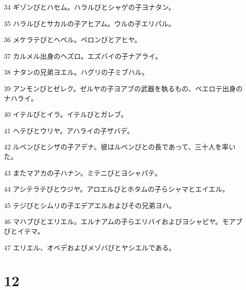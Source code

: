 \par 34 ギゾンびとハセム。ハラルびとシャゲの子ヨナタン。
\par 35 ハラルびとサカルの子アヒアム。ウルの子エリパル。
\par 36 メケラテびとヘペル。ペロンびとアヒヤ。
\par 37 カルメル出身のヘズロ。エズバイの子ナアライ。
\par 38 ナタンの兄弟ヨエル。ハグリの子ミブハル。
\par 39 アンモンびとゼレク。ゼルヤの子ヨアブの武器を執るもの、ベエロテ出身のナハライ。
\par 40 イテルびとイラ。イテルびとガレブ。
\par 41 ヘテびとウリヤ。アハライの子ザバデ。
\par 42 ルベンびとシザの子アデナ。彼はルベンびとの長であって、三十人を率いた。
\par 43 またマアカの子ハナン。ミテニびとヨシャパテ。
\par 44 アシテラテびとウジヤ。アロエルびとホタムの子らシャマとエイエル。
\par 45 テジびとシムリの子エデアエルおよびその兄弟ヨハ。
\par 46 マハブびとエリエル。エルナアムの子らエリバイおよびヨシャビヤ。モアブびとイテマ。
\par 47 エリエル、オベデおよびメゾバびとヤシエルである。

\chapter{12}

